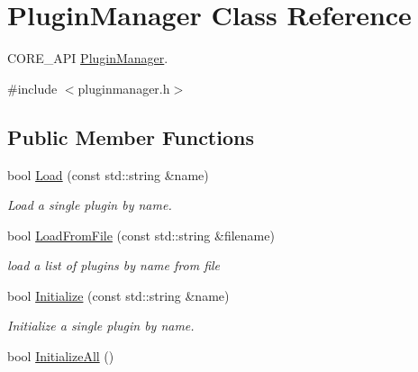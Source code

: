 \hypertarget{class_plugin_manager}{}\section{Plugin\+Manager Class Reference}
\label{class_plugin_manager}


C\+O\+R\+E\+\_\+\+A\+PI \hyperlink{class_plugin_manager}{Plugin\+Manager}.  




{\ttfamily \#include $<$pluginmanager.\+h$>$}

\subsection*{Public Member Functions}
\begin{DoxyCompactItemize}
\item 
\mbox{\label{class_plugin_manager_a9cfa0cf37c1f03371d83f56d48b26884}} 
bool \hyperlink{class_plugin_manager_a9cfa0cf37c1f03371d83f56d48b26884}{Load} (const std\+::string \&name)
\begin{DoxyCompactList}\small\item\em Load a single plugin by name. \end{DoxyCompactList}\item 
\mbox{\label{class_plugin_manager_acf215381606a14747a8a0766bef9e1f1}} 
bool \hyperlink{class_plugin_manager_acf215381606a14747a8a0766bef9e1f1}{Load\+From\+File} (const std\+::string \&filename)
\begin{DoxyCompactList}\small\item\em load a list of plugins by name from file \end{DoxyCompactList}\item 
\mbox{\label{class_plugin_manager_a956e653b7db36da9d034b4a93c8308d5}} 
bool \hyperlink{class_plugin_manager_a956e653b7db36da9d034b4a93c8308d5}{Initialize} (const std\+::string \&name)
\begin{DoxyCompactList}\small\item\em Initialize a single plugin by name. \end{DoxyCompactList}\item 
\mbox{\label{class_plugin_manager_a66bbd81ad0771e495af91718c0c58859}} 
bool \hyperlink{class_plugin_manager_a66bbd81ad0771e495af91718c0c58859}{Initialize\+All} ()

\end{DoxyCompactItemize}
